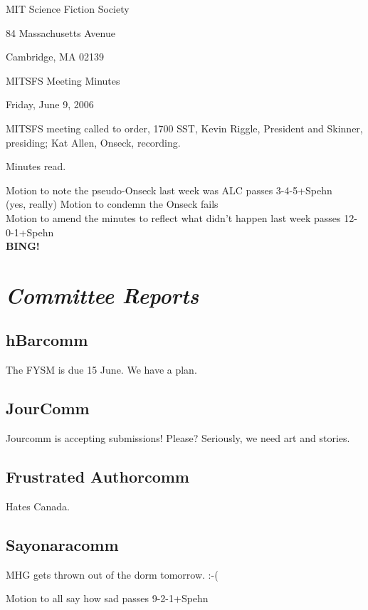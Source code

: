 \documentclass[10pt]{article}
\newcommand{\bing}{{\bf BING!} }
\newcommand{\goto}[1]{\bing \vskip 12pt \section*{{\em{#1}}}}
\begin{document}
\begin{center}

MIT Science Fiction Society

84 Massachusetts Avenue

Cambridge, MA 02139

\vspace{12pt}

MITSFS Meeting Minutes

Friday, June 9, 2006

\end{center}

\vspace{18pt}

\setlength{\parskip}{6pt}

\noindent
MITSFS meeting called to order, 1700 SST,
Kevin Riggle, President and Skinner, presiding; Kat Allen, Onseck, recording.

Minutes read.

Motion to note the pseudo-Onseck last week was ALC passes 3-4-5+Spehn\\
(yes, really)
Motion to condemn the Onseck fails\\
Motion to amend the minutes to reflect what didn't happen last week passes 12-0-1+Spehn\\

\goto{Committee Reports}

\subsection*{hBarcomm}
The FYSM is due 15 June. We have a plan. 

\subsection*{JourComm}
Jourcomm is accepting submissions! Please? Seriously, we need art and stories. 

\subsection*{Frustrated Authorcomm}
Hates Canada.

\subsection{Sayonaracomm}
MHG gets thrown out of the dorm tomorrow. :-(

Motion to all say how sad passes 9-2-1+Spehn
\end{document}
